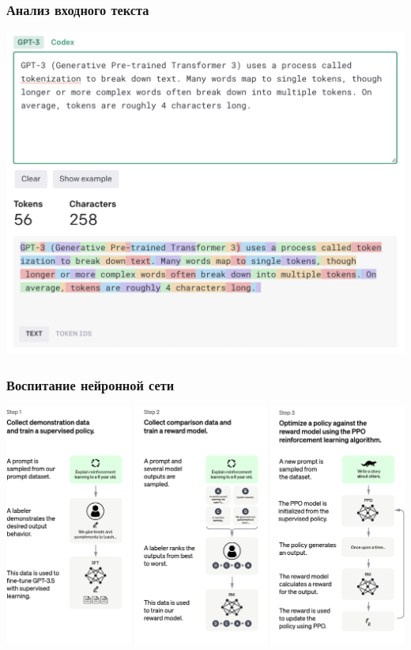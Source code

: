 \documentclass[10pt]{beamer}
\begin{document}
\begin{frame}
  \frametitle{Анализ входного текста}
  \begin{center}
    \includegraphics[width=1\linewidth]{pics/gpt-parsing.png}
  \end{center}
\end{frame}

\begin{frame}
  \frametitle{Воспитание нейронной сети}
  \begin{center}
    \includegraphics[width=1\linewidth]{pics/ChatGPT_Diagram.pdf}
  \end{center}
\end{frame}
\end{document}
